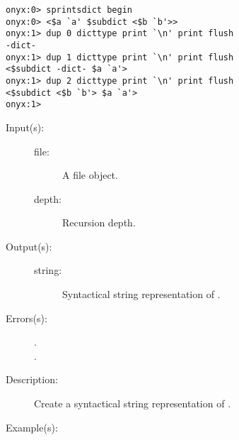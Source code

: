\begin{description}
\begin{description}
\begin{verbatim}
onyx:0> sprintsdict begin
onyx:0> <$a `a' $subdict <$b `b'>>
onyx:1> dup 0 dicttype print `\n' print flush
-dict-
onyx:1> dup 1 dicttype print `\n' print flush
<$subdict -dict- $a `a'>
onyx:1> dup 2 dicttype print `\n' print flush
<$subdict <$b `b'> $a `a'>
onyx:1>
		\end{verbatim}
	\end{description}
\label{sprintsdict:filetype}
\item[{\onyxop{file depth}{filetype}{string}}: ]
	\begin{description}\item[]
	\item[Input(s): ]
		\begin{description}\item[]
		\item[file: ]
			A file object.
		\item[depth: ]
			Recursion depth.
		\end{description}
	\item[Output(s): ]
		\begin{description}\item[]
		\item[string: ]
			Syntactical string representation of .
		\end{description}
	\item[Errors(s): ]
		\begin{description}\item[]
		\item[.]
		\item[.]
		\end{description}
	\item[Description: ]
		Create a syntactical string representation of .
	\item[Example(s): ]\begin{verbatim}


\end{verbatim}
\end{description}
\end{description}
